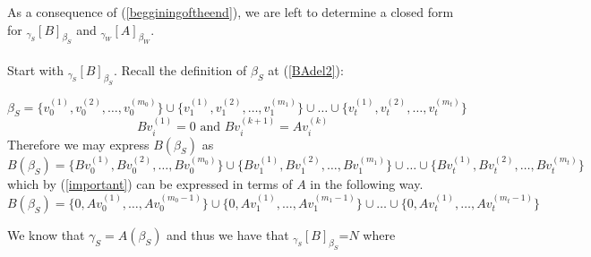 As a consequence of (\ref{begginingoftheend}), we are left to determine a closed form for $_{\gamma_S}[B]_{\beta_S}$ and $_{\gamma_W}[A]_{\beta_W}$.\\\\
Start with $_{\gamma_S}[B]_{\beta_S}$. Recall the definition of $\beta_S$ at (\ref{BAdel2}):

\begin{equation}
    \beta_S=\{v_{0}^{(1)},v_{0}^{(2)},\dots,v_{0}^{(m_0)}\} \cup \{v_{1}^{(1)},v_{1}^{(2)},\dots,v_{1}^{(m_1)}\} \cup \dots \cup \{v_{t}^{(1)},v_{t}^{(2)},\dots,v_{t}^{(m_t)}\} 
 \end{equation}
\begin{equation}\label{important}
   Bv_{i}^{(1)}=0 \text{ and } Bv_{i}^{(k+1)}=Av_{i}^{(k)}
\end{equation}
Therefore we may express $B(\beta_S)$ as
\begin{equation}
    B(\beta_S)=\{Bv_{0}^{(1)},Bv_{0}^{(2)},\dots,Bv_{0}^{(m_0)}\} \cup \{Bv_{1}^{(1)},Bv_{1}^{(2)},\dots,Bv_{1}^{(m_1)}\} \cup \dots \cup \{Bv_{t}^{(1)},Bv_{t}^{(2)},\dots,Bv_{t}^{(m_t)}\} 
 \end{equation}
which by (\ref{important}) can be expressed in terms of $A$ in the following way.
\begin{equation}
    B(\beta_S)=\{0,Av_{0}^{(1)},\dots,Av_{0}^{(m_0-1)}\} \cup \{0,Av_{1}^{(1)},\dots,Av_{1}^{(m_1-1)}\} \cup \dots \cup \{0,Av_{t}^{(1)},\dots,Av_{t}^{(m_t-1)}\} 
 \end{equation}
 
 We know that $\gamma_S=A(\beta_S)$ and thus we have that $_{\gamma_S}[B]_{\beta_S}$=$N$ where

